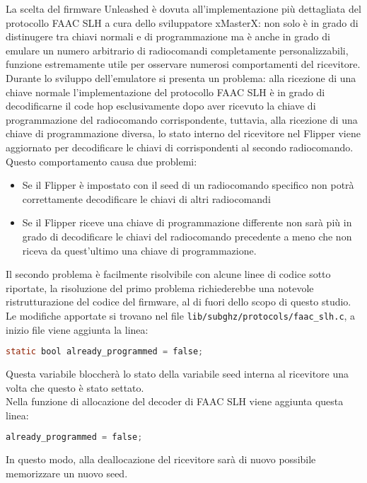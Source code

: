 La scelta del firmware Unleashed è dovuta all’implementazione più dettagliata del protocollo FAAC SLH a cura dello sviluppatore xMasterX: non solo è in grado di distinugere tra chiavi normali e di programmazione ma è anche in grado di emulare un numero arbitrario di radiocomandi completamente personalizzabili, funzione estremamente utile per osservare numerosi comportamenti del ricevitore.\\
Durante lo sviluppo dell’emulatore si presenta un problema: alla ricezione di una chiave normale l’implementazione del protocollo FAAC SLH è in grado di decodificarne il code hop esclusivamente dopo aver ricevuto la chiave di programmazione del radiocomando corrispondente, tuttavia, alla ricezione di una chiave di programmazione diversa, lo stato interno del ricevitore nel Flipper viene aggiornato per decodificare le chiavi di corrispondenti al secondo radiocomando. Questo comportamento causa due problemi:
\begin{itemize}
  \item Se il Flipper è impostato con il seed di un radiocomando specifico non potrà correttamente decodificare le chiavi di altri radiocomandi
  \item Se il Flipper riceve una chiave di programmazione differente non sarà più in grado di decodificare le chiavi del radiocomando precedente a meno che non riceva da quest’ultimo una chiave di programmazione.
\end{itemize}
Il secondo problema è facilmente risolvibile con alcune linee di codice sotto riportate, la risoluzione del primo problema richiederebbe una notevole ristrutturazione del codice del firmware, al di fuori dello scopo di questo studio.\\
Le modifiche apportate si trovano nel file \texttt{lib/subghz/protocols/faac\_slh.c}, a inizio file viene aggiunta la linea:
\begin{lstlisting}[language=C,basicstyle=\small]
  static bool already_programmed = false;
\end{lstlisting}
Questa variabile bloccherà lo stato della variabile seed interna al ricevitore una volta che questo è stato settato.\\
Nella funzione di allocazione del decoder di FAAC SLH viene aggiunta questa linea:
\begin{lstlisting}[language=C,basicstyle=\small]
  already_programmed = false;
\end{lstlisting}
In questo modo, alla deallocazione del ricevitore sarà di nuovo possibile memorizzare un nuovo seed.\\
